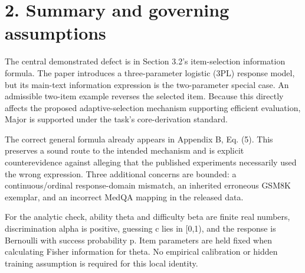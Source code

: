\documentclass[10pt]{article}
\begin{document}
\section*{2. Summary and governing assumptions}
The central demonstrated defect is in Section 3.2’s item-selection information formula. The paper introduces a three-parameter logistic (3PL) response model, but its main-text information expression is the two-parameter special case. An admissible two-item example reverses the selected item. Because this directly affects the proposed adaptive-selection mechanism supporting efficient evaluation, Major is supported under the task’s core-derivation standard.\par
The correct general formula already appears in Appendix B, Eq. (5). This preserves a sound route to the intended mechanism and is explicit counterevidence against alleging that the published experiments necessarily used the wrong expression. Three additional concerns are bounded: a continuous/ordinal response-domain mismatch, an inherited erroneous GSM8K exemplar, and an incorrect MedQA mapping in the released data.\par
For the analytic check, ability theta and difficulty beta are finite real numbers, discrimination alpha is positive, guessing c lies in [0,1), and the response is Bernoulli with success probability p. Item parameters are held fixed when calculating Fisher information for theta. No empirical calibration or hidden training assumption is required for this local identity.\par
\end{document}
